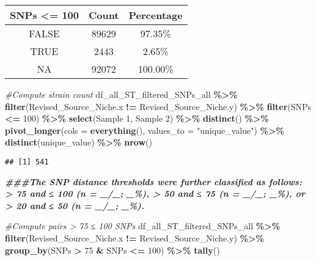 \documentclass[
]{article}
\newenvironment{Shaded}{\begin{snugshade}}{\end{snugshade}}
\newcommand{\AttributeTok}[1]{\textcolor[rgb]{0.13,0.29,0.53}{#1}}
\newcommand{\CommentTok}[1]{\textcolor[rgb]{0.56,0.35,0.01}{\textit{#1}}}
\newcommand{\DecValTok}[1]{\textcolor[rgb]{0.00,0.00,0.81}{#1}}
\newcommand{\DocumentationTok}[1]{\textcolor[rgb]{0.56,0.35,0.01}{\textbf{\textit{#1}}}}
\newcommand{\FunctionTok}[1]{\textcolor[rgb]{0.13,0.29,0.53}{\textbf{#1}}}
\newcommand{\NormalTok}[1]{#1}
\newcommand{\SpecialCharTok}[1]{\textcolor[rgb]{0.81,0.36,0.00}{\textbf{#1}}}
\newcommand{\StringTok}[1]{\textcolor[rgb]{0.31,0.60,0.02}{#1}}
\begin{document}
\begin{longtable}[]{@{}ccc@{}}
\toprule\noalign{}
SNPs \textless= 100 & Count & Percentage \\
\midrule\noalign{}
\endhead
\bottomrule\noalign{}
\endlastfoot
FALSE & 89629 & 97.35\% \\
TRUE & 2443 & 2.65\% \\
NA & 92072 & 100.00\% \\
\end{longtable}

\begin{Shaded}
\begin{Highlighting}[]
\CommentTok{\#Compute strain count}
\NormalTok{df\_all\_ST\_filtered\_SNPs\_all }\SpecialCharTok{\%\textgreater{}\%} \FunctionTok{filter}\NormalTok{(Revised\_Source\_Niche.x }\SpecialCharTok{!=}\NormalTok{ Revised\_Source\_Niche.y) }\SpecialCharTok{\%\textgreater{}\%}
  \FunctionTok{filter}\NormalTok{(SNPs }\SpecialCharTok{\textless{}=} \DecValTok{100}\NormalTok{) }\SpecialCharTok{\%\textgreater{}\%}
  \FunctionTok{select}\NormalTok{(}\StringTok{\textasciigrave{}}\AttributeTok{Sample 1}\StringTok{\textasciigrave{}}\NormalTok{, }\StringTok{\textasciigrave{}}\AttributeTok{Sample 2}\StringTok{\textasciigrave{}}\NormalTok{) }\SpecialCharTok{\%\textgreater{}\%}
  \FunctionTok{distinct}\NormalTok{() }\SpecialCharTok{\%\textgreater{}\%}
  \FunctionTok{pivot\_longer}\NormalTok{(}\AttributeTok{cols =} \FunctionTok{everything}\NormalTok{(), }\AttributeTok{values\_to =} \StringTok{"unique\_value"}\NormalTok{) }\SpecialCharTok{\%\textgreater{}\%}
  \FunctionTok{distinct}\NormalTok{(unique\_value) }\SpecialCharTok{\%\textgreater{}\%} \FunctionTok{nrow}\NormalTok{()}
\end{Highlighting}
\end{Shaded}

\begin{verbatim}
## [1] 541
\end{verbatim}

\begin{Shaded}
\begin{Highlighting}[]
\DocumentationTok{\#\#\#The SNP distance thresholds were further classified as follows: \textgreater{} 75 and ≤ 100 (n = \_/\_; \_\%), \textgreater{} 50 and ≤ 75 (n = \_/\_; \_\%), or \textgreater{} 20 and ≤ 50 (n = \_/\_; \_\%).}

\CommentTok{\#Compute pairs \textgreater{} 75 ≤ 100 SNPs}
\NormalTok{df\_all\_ST\_filtered\_SNPs\_all }\SpecialCharTok{\%\textgreater{}\%} \FunctionTok{filter}\NormalTok{(Revised\_Source\_Niche.x }\SpecialCharTok{!=}\NormalTok{ Revised\_Source\_Niche.y) }\SpecialCharTok{\%\textgreater{}\%} \FunctionTok{group\_by}\NormalTok{(SNPs }\SpecialCharTok{\textgreater{}} \DecValTok{75} \SpecialCharTok{\&}\NormalTok{ SNPs }\SpecialCharTok{\textless{}=} \DecValTok{100}\NormalTok{) }\SpecialCharTok{\%\textgreater{}\%} \FunctionTok{tally}\NormalTok{()}
\end{Highlighting}
\end{Shaded}
\end{document}
